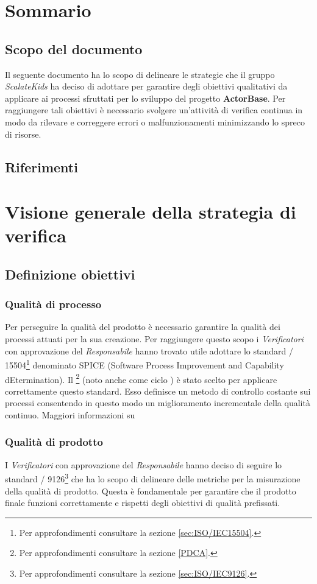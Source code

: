 \documentclass{scalatekids-article}
\begin{document}
\section{Sommario}
\subsection{Scopo del documento}
Il seguente documento ha lo scopo di delineare le strategie che il gruppo \textit{ScalateKids} ha deciso di adottare per garantire degli obiettivi qualitativi da applicare ai processi sfruttati per lo sviluppo del progetto \textbf{ActorBase}. Per raggiungere tali obiettivi è necessario svolgere un'attività di verifica continua in modo da rilevare e correggere errori o malfunzionamenti minimizzando lo spreco di risorse.
\prodPurpose
\glossExpl
\subsection{Riferimenti}
\newpage
\section{Visione generale della strategia di verifica}
\subsection{Definizione obiettivi}
\subsubsection{Qualità di processo}
Per perseguire la qualità del prodotto è necessario garantire la qualità dei processi attuati per la sua creazione. Per raggiungere questo scopo i \textit{Verificatori} con approvazione del \textit{Responsabile} hanno trovato utile adottare lo standard / 15504\footnote[1]{Per approfondimenti consultare la sezione \ref{sec:ISO/IEC15504}.} denominato SPICE (Software Process Improvement and Capability dEtermination). Il \footnote[2]{Per approfondimenti consultare la sezione \ref{PDCA}.} (noto anche come ciclo ) è stato scelto per applicare correttamente questo standard. Esso definisce un metodo di controllo costante sui processi consentendo in questo modo un miglioramento incrementale della qualità continuo. Maggiori informazioni su 
\subsubsection{Qualità di prodotto}
I \textit{Verificatori} con approvazione del \textit{Responsabile} hanno deciso di seguire lo standard / 9126\footnote[3]{Per approfondimenti consultare la sezione \ref{sec:ISO/IEC9126}.} che ha lo scopo di delineare delle metriche per la misurazione della qualità di prodotto. Questa è fondamentale per garantire che il prodotto  finale funzioni correttamente e rispetti degli obiettivi di qualità prefissati.
\end{document}
